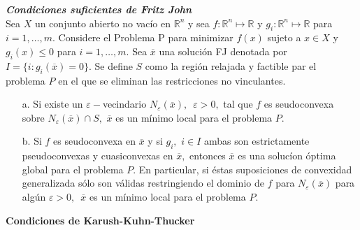 {\teorema \textbf{\itshape Condiciones suficientes de Fritz John \cite{no-lineal}}\\
Sea $X$ un conjunto abierto no vac\'io en $\mathbb{R}^n$ y sea $f: \mathbb{R}^n \longmapsto \mathbb{R}$ y 
$g_i : \mathbb{R}^n \longmapsto \mathbb{R}$ para $i = 1, \ldots , m.$ Considere el  Problema P para minimizar $f(x)$ sujeto a $x \in X$ y 
$g_i(x) \leqslant 0$ para $i = 1, \ldots , m.$ Sea $\overline{x}$ una soluci\'on FJ denotada por $I = \{i: g_i(\overline{x}) = 0\}.$ Se
define $S$ como la regi\'on relajada y factible par el problema $P$ en el que se eliminan las restricciones no vinculantes.%

\begin{itemize}%
   \item[a.] Si existe un $\varepsilon-$vecindario $N_{\varepsilon}(\overline{x}),\,\,\, \varepsilon > 0,$ tal que $f$ es seudoconvexa sobre 
   $N_{\varepsilon}(\overline{x}) \cap S,\,\, \overline{x} $ es un m\'inimo local para el problema $P.$
   \item[b.] Si $f$ es seudoconvexa en $\overline{x} $ y si $g_i,\,\, i \in I$ ambas son estrictamente pseudoconvexas y cuasiconvexas en 
   $\overline{x}, $ entonces $\overline{x} $ es una soluc\'ion \'optima global para el problema $P.$ En particular, si \'estas suposiciones de
   convexidad generalizada s\'olo son v\'alidas restringiendo el dominio de $f$ para $N_{\varepsilon}(\overline{x}) $ para alg\'un 
   $\varepsilon > 0,\,\,\, \overline{x}$ es un m\'inimo local para el problema $P.$
   \end{itemize}
\label{fritz-suf}}

\medskip

\textbf{Condiciones de Karush-Kuhn-Thucker \cite{no-lineal}}\\ \\ 

